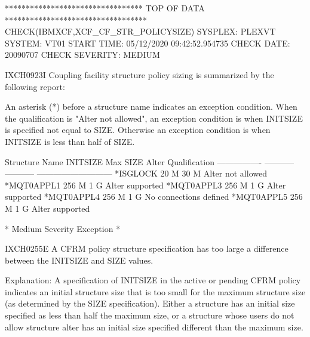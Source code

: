 ********************************* TOP OF DATA **********************************
CHECK(IBMXCF,XCF\_CF\_STR\_POLICYSIZE)                                            
SYSPLEX:    PLEXVT    SYSTEM: VT01                                             
START TIME: 05/12/2020 09:42:52.954735                                         
CHECK DATE: 20090707  CHECK SEVERITY: MEDIUM                                   

                                                                            
IXCH0923I Coupling facility structure policy sizing is summarized by the       
following report:                                                               

An asterisk (*) before a structure name indicates an exception                 
condition. When the qualification is "Alter not allowed", an exception         
condition is when INITSIZE is specified not equal to SIZE. Otherwise an        
exception condition is when INITSIZE is less than half of SIZE.                

Structure Name    INITSIZE     Max SIZE     Alter Qualification               
----------------  -----------  -----------  ---------------------------       
*ISGLOCK                  20 M         30 M  Alter not allowed                  
*MQT0APPL1               256 M          1 G  Alter supported                   
*MQT0APPL3               256 M          1 G  Alter supported                   
*MQT0APPL4               256 M          1 G  No connections defined             
*MQT0APPL5               256 M          1 G  Alter supported                   
                                                                              
* Medium Severity Exception *                                                  

IXCH0255E A CFRM policy structure specification has too large a                
difference between the INITSIZE and SIZE values.                               

  Explanation:  A specification of INITSIZE in the active or pending           
	CFRM policy indicates an initial structure size that is too small          
    for the maximum structure size (as determined by the SIZE                  
    specification). Either a structure has an initial size specified as        
    less than half the maximum size, or a structure whose users do not         
    allow structure alter has an initial size specified different than         
    the maximum size.                                                          

